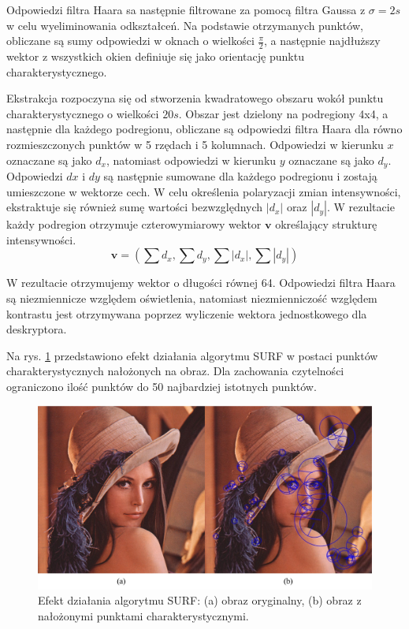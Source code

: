 Odpowiedzi filtra Haara sa następnie filtrowane za pomocą filtra Gaussa z $\sigma = 2s$ w celu wyeliminowania odkształceń. Na podstawie otrzymanych punktów, obliczane są sumy odpowiedzi w oknach o wielkości $\frac{\pi}{2}$, a następnie najdłuższy wektor z wszystkich okien definiuje się jako orientację punktu charakterystycznego.

Ekstrakcja rozpoczyna się od stworzenia kwadratowego obszaru wokół punktu charakterystycznego o wielkości $20s$. Obszar jest dzielony na podregiony 4x4, a następnie dla każdego podregionu, obliczane są odpowiedzi filtra Haara dla równo rozmieszczonych punktów w 5 rzędach i 5 kolumnach. Odpowiedzi  w kierunku $x$ oznaczane są jako $d_x$, natomiast odpowiedzi w kierunku $y$ oznaczane są jako $d_y$. Odpowiedzi $dx$ i $dy$ są następnie sumowane dla każdego podregionu i zostają umieszczone w wektorze cech. W celu określenia polaryzacji zmian intensywności, ekstraktuje się również sumę wartości bezwzględnych $|d_x|$ oraz $|d_y|$. W rezultacie każdy podregion otrzymuje czterowymiarowy wektor $\boldsymbol{v}$ określający strukturę intensywności.
\begin{equation} 
\label{surf_v_vector} 
\boldsymbol{v} = (\sum{d_x}, \sum{d_y}, \sum{|d_x|}, \sum{|d_y|})
\end{equation}

W rezultacie otrzymujemy wektor o długości równej 64. Odpowiedzi filtra Haara są niezmiennicze względem oświetlenia, natomiast niezmienniczość względem kontrastu jest otrzymywana poprzez wyliczenie wektora jednostkowego dla deskryptora.

Na rys. \ref{fig:surf-keypoints} przedstawiono efekt działania algorytmu SURF w postaci punktów charakterystycznych nałożonych na obraz. Dla zachowania czytelności ograniczono ilość punktów do 50 najbardziej istotnych punktów.

\begin{figure}[h]
	\centering
	\includegraphics[scale=0.5]{graphics/01_podstawy_teoretyczne/surf-keypoints.pdf}
	\caption{ Efekt działania algorytmu SURF: (a) obraz oryginalny, (b) obraz z nałożonymi punktami charakterystycznymi. }
	\label{fig:surf-keypoints}
\end{figure}

